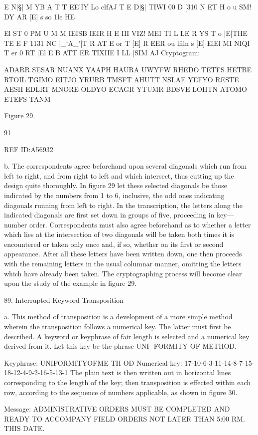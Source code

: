 E N|§| M YB A T T EE’IY Lo clfAJ T E D|§| TIWI 00
D [310 N ET H o u SM! DY AR [E] s so 1le HE
{El ST 0 PM U M M IEISB IEIR H E III VIZ! MEI TI
L LE R YS T o |E|THE TE E F 1131 NC |_‘A_'|T
R AT E or T [E] R EER ou lﬁln s [E] ElEl MI NIQI
T er 0 RT |El E B ATT ER TIXIIE I LL [SIM AJ
Cryptogram:

ADARR SESAR NUANX YAAPH HAURA UWYFW
RHEDO TETFS HETBE RTOIL TGIMO EITJO
YRURB TMSFT AHUTT NSLAE YEFYO RESTE
AESII EDLRT MNORE OLDYO ECAGR YTUMR
BDSVE LOHTN ATOMO ETEFS TANM

Figure 29.

91

 

REF ID:A56932

b. The correspondents agree beforehand upon several diagonals which
run from left to right, and from right to left and which intersect,
thus cutting up the design quite thoroughly. In ﬁgure 29 let these selected
diagonals be those indicated by the numbers from 1 to 6, inclusive,
the odd ones indicating diagonals running from left to right. In the
transcription, the letters along the indicated diagonals are ﬁrst set down
in groups of ﬁve, proceeding in key—number order. Correspondents must
also agree beforehand as to whether a letter which lies at the intersection
of two diagonals will be taken both times it is encountered or taken
only once and, if so, whether on its ﬁrst or second appearance. After
all these letters have been written down, one then proceeds with the
remaining letters in the usual columnar manner, omitting the letters
which have already been taken. The cryptographing process will become
clear upon the study of the example in ﬁgure 29.

89. Interrupted Keyword Transposition

a. This method of transposition is a development of a more simple
method wherein the transposition follows a numerical key. The latter
must ﬁrst be described. A keyword or keyphrase of fair length is selected
and a numerical key derived from it. Let this key be the phrase UNI-
FORMITY OF METHOD.

Keyphrase: UNIFORMITYOFME TH OD
Numerical key: 17-10-6-3-11-14-8-7-15-18-12-4-9-2-16-5-13-1
The plain text is then written out in horizontal lines corresponding
to the length of the key; then transposition is effected within each row,
according to the sequence of numbers applicable, as shown in ﬁgure 30.

Message: ADMINISTRATIVE ORDERS MUST BE COMPLETED AND
READY TO ACCOMPANY FIELD ORDERS NOT LATER
THAN 5:00 RM. THIS DATE.

}
